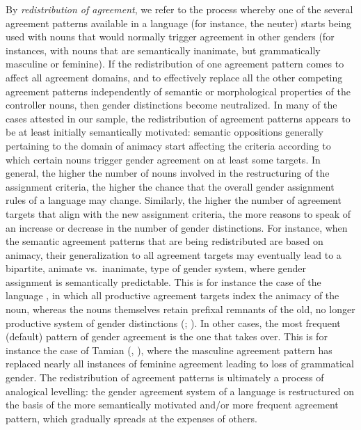 \documentclass[output=collectionpaper]{langsci/langscibook}
\begin{document}
By \textit{redistribution of agreement}, we refer to the process whereby one of the several agreement patterns available in a language (for instance, the neuter) starts being used with nouns that would normally trigger agreement in other genders (for instances, with nouns that are semantically inanimate, but grammatically masculine or feminine). If the redistribution of one agreement pattern comes to affect all agreement domains, and to effectively replace all the other competing agreement patterns independently of semantic or morphological properties of the controller nouns, then gender distinctions become neutralized. In many of the cases attested in our sample, the redistribution of agreement patterns appears to be at least initially semantically motivated: semantic oppositions generally pertaining to the domain of animacy start affecting the criteria according to which certain nouns trigger gender agreement on at least some targets. In general, the higher the number of nouns involved in the restructuring of the assignment criteria, the higher the chance that the overall gender assignment rules of a language may change. Similarly, the higher the number of agreement targets that align with the new assignment criteria, the more reasons to speak of an increase or decrease in the number of gender distinctions. For instance, when the semantic agreement patterns that are being redistributed are based on animacy, their generalization to all agreement targets may eventually lead to a bipartite, animate vs.\ inanimate, type of gender system, where gender assignment is semantically predictable. This is for instance the case of the  language , in which all productive agreement targets index the animacy of the noun, whereas the nouns themselves retain prefixal remnants of the old, no longer productive system of gender distinctions (\citealt[130--132]{Maho1999}; \citealt[28--29]{Meeuwis2013}). In other cases, the most frequent (default) pattern of gender agreement is the one that takes over. This is for instance the case of Tamian  (, ), where the masculine agreement pattern has replaced nearly all instances of feminine agreement leading to loss of grammatical gender. The redistribution of agreement patterns is ultimately a process of analogical levelling: the gender agreement system of a language is restructured on the basis of the more semantically motivated and/or more frequent agreement pattern, which gradually spreads at the expenses of others.
\end{document}
